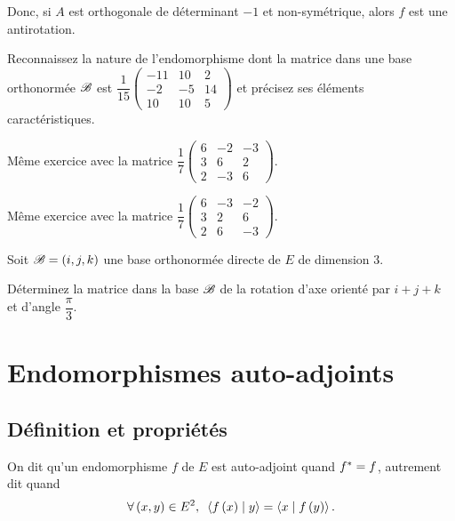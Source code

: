 Donc, si \(A\) est orthogonale de déterminant \(-1\) et non-symétrique, alors \(f\) est une antirotation.

\begin{exo}
Reconnaissez la nature de l'endomorphisme dont la matrice dans une base orthonormée \(\mathscr{B}\) est \(\dfrac{1}{15}\begin{pmatrix}
-11 & 10 & 2 \\
-2 & -5 & 14 \\
10 & 10 & 5
\end{pmatrix}\) et précisez ses éléments caractéristiques.
\end{exo}

\begin{exo}
Même exercice avec la matrice \(\dfrac{1}{7}\begin{pmatrix}
6 & -2 & -3 \\
3 & 6 & 2 \\
2 & -3 & 6
\end{pmatrix}\).
\end{exo}

\begin{exo}
Même exercice avec la matrice \(\dfrac{1}{7}\begin{pmatrix}
6 & -3 & -2 \\
3 & 2 & 6 \\
2 & 6 & -3
\end{pmatrix}\).
\end{exo}

\begin{exo}
Soit \(\mathscr{B}=\left(i,j,k\right)\) une base orthonormée directe de \(E\) de dimension \(3\).

Déterminez la matrice dans la base \(\mathscr{B}\) de la rotation d'axe orienté par \(i+j+k\) et d'angle \(\dfrac{\pi}{3}\).
\end{exo}

\section{Endomorphismes auto-adjoints}

\subsection{Définition et propriétés}

\begin{defi}
On dit qu'un endomorphisme \(f\) de \(E\) est auto-adjoint quand \(f^*=f\), autrement dit quand \[\quantifs{\forall\paren{x,y}\in E^2}\ps{f\paren{x}}{y}=\ps{x}{f\paren{y}}.\]
\end{defi}

